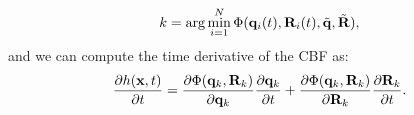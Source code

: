 \begin{equation}
k = \arg\min_{i=1}^{N} \Phi(\mathbf{q}_i(t), \mathbf{R}_i(t), \tilde{\mathbf{q}}, \tilde{\mathbf{R}}), 
\end{equation}
%
and we can compute the time derivative of the CBF as:
\begin{equation}
\label{eq: time_derivative}
\frac{\partial h(\mathbf{x}, t)}{\partial t} = \frac{\partial \Phi(\mathbf{q}_k, \mathbf{R}_k)}{\partial \mathbf{q}_k} \frac{\partial \mathbf{q}_k}{\partial t} + \frac{\partial \Phi(\mathbf{q}_k, \mathbf{R}_k)}{\partial \mathbf{R}_k} \frac{\partial \mathbf{R}_k}{\partial t}.
\end{equation}
%

